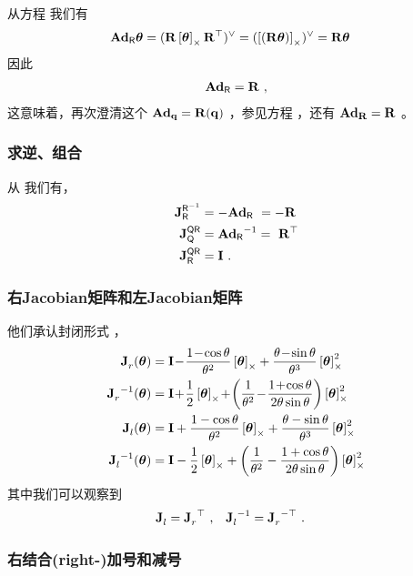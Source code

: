 从方程  我们有
%
\begin{align*}
\Ad{\sR} \bth
&= (\bfR\hatx{\bth}\bfR\tr)^\vee 
= (\hatx{(\bfR\bth)})^\vee 
= \bfR\bth
\end{align*}
%
因此
%
\begin{align}
\Ad{\sR} = \bfR~,
\end{align}
%
这意味着，再次澄清这个 $\Ad[S^3]{\bfq}=\bfR(\bfq)$ ，参见方程  ，还有 $\Ad[\SO(3)]{\bfR}=\bfR$ 。

\subsubsection{求逆、组合}
\label{sec:SO3_inv_comp}

从  我们有，
%
\begin{align}
\mjac{\sR\inv}{\sR} &= -\Ad{\sR} ~= -\bfR \\
\mjac{\sQ\sR}{\sQ} &= \Ad{\sR}\inv = ~\bfR\tr \\
\mjac{\sQ\sR}{\sR} &= \bfI ~.
\end{align}


\subsubsection{右Jacobian矩阵和左Jacobian矩阵}

他们承认封闭形式 \cite[pag.~40]{CHIRIKJIAN-11}， 
%
\begin{align}
\mjac{}{r}(\bth) &= \bfI \!-\! \frac{1\!-\!\cos\theta}{\theta^2}\hatx{\bth} + \frac{\theta\!-\!\sin\theta}{\theta^3}\hatx{\bth}^2\\
\mjac{}{r}\inv(\bth) &= \bfI \!+\! \frac12\hatx{\bth} \!+\! \left(\frac{1}{\theta^2} \!-\! \frac{1\!+\!\cos\theta}{2\theta\sin\theta}\right)\hatx{\bth}^2 \\
\mjac{}{l}(\bth) &= \bfI + \frac{1-\cos\theta}{\theta^2}\hatx{\bth} + \frac{\theta-\sin\theta}{\theta^3}\hatx{\bth}^2 \label{equ:SO3_Jl} \\
\mjac{}{l}\inv(\bth) &= \bfI - \frac12\hatx{\bth} + \left(\frac1{\theta^2} - \frac{1+\cos\theta}{2\theta\sin\theta}\right)\hatx{\bth}^2 \label{equ:SO3_Jl_inv}
\end{align}
%
其中我们可以观察到
%
\begin{align}
\mjac{}{l} &= \mjac{}{r}\tr 
~,
&
\mjac{}{l}\inv &= \mjac{}{r}^{-\top}
~.
\end{align}

\subsubsection{右结合(right-)加号和减号}

